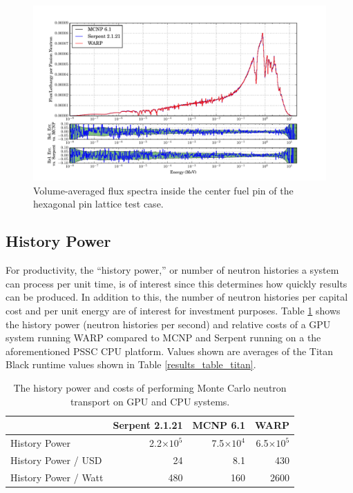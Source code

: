 \documentclass[preprint,12pt]{elsarticle}
\begin{document}
\begin{figure}[h!]
\centering
\includegraphics[width=\textwidth,trim= 1cm 0cm 1cm 0cm]{graphics/assembly-lw_spec.pdf}
\caption{Volume-averaged flux spectra inside the center fuel pin of the hexagonal pin lattice test case. \label{assembly-lw_spec} }
\end{figure}

\newpage
\subsection{History Power}

For productivity, the ``history power,'' or  number of neutron histories a system can process per unit time, is of interest since this determines how quickly results can be produced.  In addition to this, the number of neutron histories per capital cost and per unit energy are of interest for investment purposes.  Table \ref{history_power} shows the history power (neutron histories per second) and relative costs of a GPU system running WARP compared to MCNP and Serpent running on a the aforementioned PSSC CPU platform.  Values shown are averages of the Titan Black runtime values shown in Table \ref{results_table_titan}.

\begin{table}[h]
\centering
\caption{The history power and costs of performing Monte Carlo neutron transport on GPU and CPU systems.}
\label{history_power}
\small
\begin{tabular}{| l | r | r | r |}
\hline
              &  Serpent 2.1.21 & MCNP 6.1 & WARP  \\
\hline
History Power   &  2.2$\times10^5$	 & 7.5$\times10^4$	 & 6.5$\times10^5$    \\
\hline
History Power / USD    & 24 & 	8.1	 & 430    \\
\hline
History Power / Watt   & 480	 & 160	 & 2600    \\
\hline
\end{tabular}
\end{table}
\end{document}
